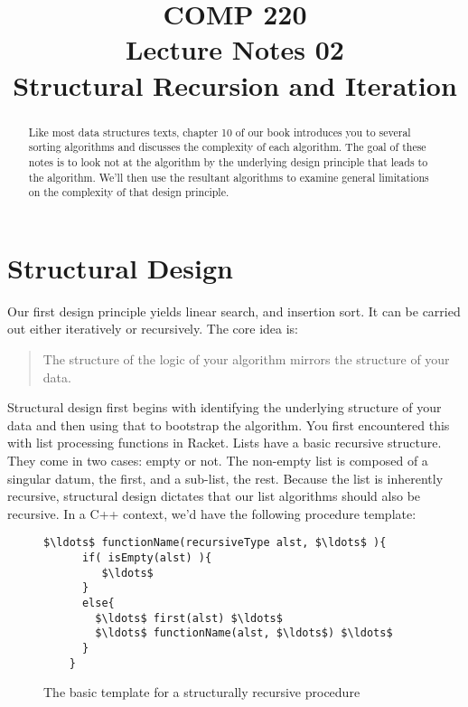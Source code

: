 \documentclass[nobib]{tufte-handout}
\title{COMP 220 \\ Lecture Notes 02 \\ Structural Recursion and Iteration}
\begin{document}
\maketitle

\begin{abstract}
  Like most data structures texts, chapter 10 of our book introduces you to several sorting algorithms and discusses the complexity of each algorithm. The goal of these notes is to look not at the algorithm by the underlying design principle that leads to the algorithm. We'll then use the resultant algorithms to examine general limitations on the complexity of that design principle.
\end{abstract}

\section{Structural Design}

Our first design principle yields linear search, and insertion sort. It can be carried out either iteratively or recursively. The core idea is:

\begin{quote}
  The structure of the logic of your algorithm mirrors the structure of your data.
\end{quote}

Structural design first begins with identifying the underlying structure of your data and then using that to bootstrap the algorithm. You first encountered this with list processing functions in Racket. Lists have a basic recursive structure. They come in two cases: empty or not. The non-empty list is composed of a singular datum, the first, and a sub-list, the rest. Because the list is inherently recursive, structural design dictates that our list algorithms should also be recursive. In a C++ context, we'd have the following procedure template:

\begin{figure}
  \begin{lstlisting}[mathescape=true]
    $\ldots$ functionName(recursiveType alst, $\ldots$ ){
      if( isEmpty(alst) ){
         $\ldots$
      }
      else{
        $\ldots$ first(alst) $\ldots$
        $\ldots$ functionName(alst, $\ldots$) $\ldots$
      }
    }
  \end{lstlisting}
\label{structRec}
\caption{The basic template for a structurally recursive procedure}
\end{figure}
\end{document}

